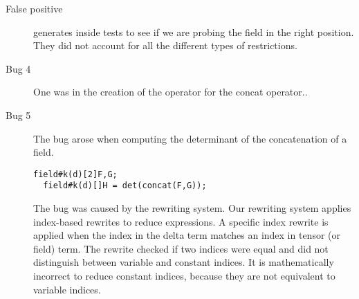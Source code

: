 \documentclass{article}
\begin{document}
\begin{description}
\item[False positive]
\checkname{} generates inside tests to see if we are probing the field in the right position.
They did not account for all the different types of restrictions.



\item[Bug 4]
One was in the creation of the \name{}  operator for the concat operator..

\item[Bug 5]
The bug arose when computing the determinant of the concatenation of a field.
\begin{lstlisting}[mathescape=true]
  field#k(d)[2]F,G;
  field#k(d)[]H = det(concat(F,G));
\end{lstlisting}
The bug was caused by the rewriting system.
Our rewriting system applies index-based rewrites to reduce \name{} expressions. 
A specific index rewrite is applied when the index in the delta term matches an index in tensor (or field)  term.
The rewrite checked if two indices were equal and did not distinguish between variable and constant indices.
It is mathematically incorrect to reduce constant indices, because they are not equivalent to variable indices.
\end{description}
\end{document}
